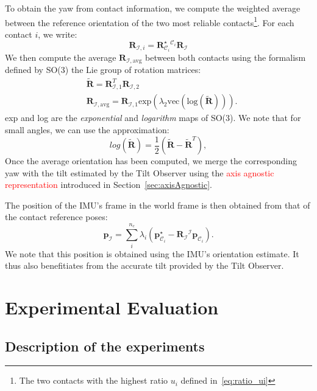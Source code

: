 \documentclass{IJCAS}
\begin{document}
To obtain the yaw from contact information, we compute the weighted average between the reference orientation of the two most reliable contacts\footnote{The two contacts with the highest ratio $u_{i}$ defined in~\eqref{eq:ratio_ui}}. For each contact $i$, we write:
\begin{equation}
    \boldsymbol{R}_{\mathcal{I}, i} = \boldsymbol{R}^{\star}_{\mathcal{C}_{i}} {}^{\mathcal{C}_{i}} \boldsymbol{R}_{\mathcal{I}} 
\end{equation}
We then compute the average $\boldsymbol{R}_{\mathcal{I}, \text{avg}}$ between both contacts using the formalism defined by SO(3) the Lie group of rotation matrices:
\begin{align}
    &\tilde{\boldsymbol{R}} = \boldsymbol{R}^{T}_{\mathcal{I}, 1} \boldsymbol{R}_{\mathcal{I}, 2}  \\
 & \boldsymbol{R}_{\mathcal{I}, \text{avg}} = \boldsymbol{R}_{\mathcal{I}, 1} \text{exp} \left( \lambda_{2} \text{vec}\left(\text{log} \left( \tilde{\boldsymbol{R}}\right)\right)  \right).
\end{align}
exp and log are the \emph{exponential} and \emph{logarithm} maps of SO(3). We note that for small angles, we can use the approximation:
\begin{equation}
log\left(\tilde{\boldsymbol{R}}\right) = \frac{1}{2} \left(\tilde{\boldsymbol{R}}-\tilde{\boldsymbol{R}}^{T}\right), \label{eq:log_small}
\end{equation}
Once the average orientation has been computed, we merge the corresponding yaw with the tilt estimated by the Tilt Observer using the \textcolor{red}{axis agnostic representation} introduced in Section~\ref{sec:axisAgnostic}.

The position of the IMU's frame in the world frame is then obtained from that of the contact reference poses: 
\begin{equation}
    \boldsymbol{p}_{\mathcal{I}} = \sum^{n_{c}}_{i} \lambda_{i} \left( \boldsymbol{p}^{\star}_{{\mathcal{C}}_{i}} - \boldsymbol{R}_{\mathcal{I}} {}^{\mathcal{I}}\boldsymbol{p}_{{\mathcal{C}}_{i}} \right).
\end{equation}
We note that this position is obtained using the IMU's orientation estimate. It thus also benefitiates from the accurate tilt provided by the Tilt Observer.


\section{Experimental Evaluation}
\subsection{Description of the experiments}
\end{document}
